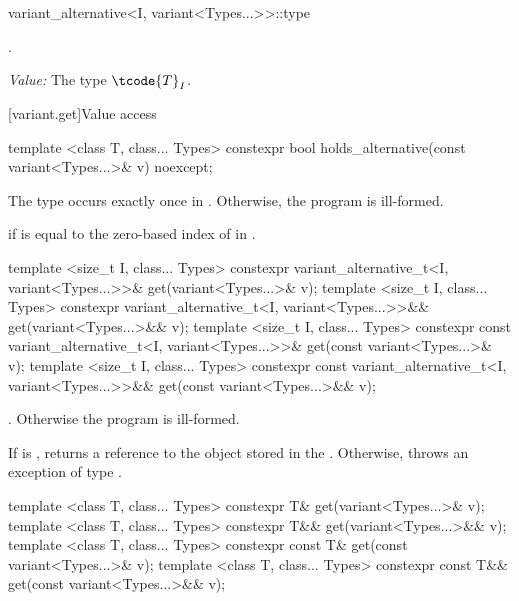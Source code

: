 %
\begin{itemdecl}
variant_alternative<I, variant<Types...>>::type
\end{itemdecl}

\begin{itemdescr}
\pnum
\requires {}.

\pnum
\textit{Value:} The type $\tcode{T}_I$.
\end{itemdescr}

[variant.get]{Value access}

\begin{itemdecl}
template <class T, class... Types>
  constexpr bool holds_alternative(const variant<Types...>& v) noexcept;
\end{itemdecl}

\begin{itemdescr}
\pnum
\requires
The type  occurs exactly once in .
Otherwise, the program is ill-formed.

\pnum
\returns
{} if  is equal to the zero-based index of  in .
\end{itemdescr}

%
\begin{itemdecl}
template <size_t I, class... Types>
  constexpr variant_alternative_t<I, variant<Types...>>& get(variant<Types...>& v);
template <size_t I, class... Types>
  constexpr variant_alternative_t<I, variant<Types...>>&& get(variant<Types...>&& v);
template <size_t I, class... Types>
  constexpr const variant_alternative_t<I, variant<Types...>>& get(const variant<Types...>& v);
template <size_t I, class... Types>
  constexpr const variant_alternative_t<I, variant<Types...>>&& get(const variant<Types...>&& v);
\end{itemdecl}

\begin{itemdescr}
\pnum
\requires
{}.
Otherwise the program is ill-formed.

\pnum
\effects
If  is , returns a reference to the object stored in
the . Otherwise, throws an exception of type .
\end{itemdescr}

%
\begin{itemdecl}
template <class T, class... Types> constexpr T& get(variant<Types...>& v);
template <class T, class... Types> constexpr T&& get(variant<Types...>&& v);
template <class T, class... Types> constexpr const T& get(const variant<Types...>& v);
template <class T, class... Types> constexpr const T&& get(const variant<Types...>&& v);
\end{itemdecl}

